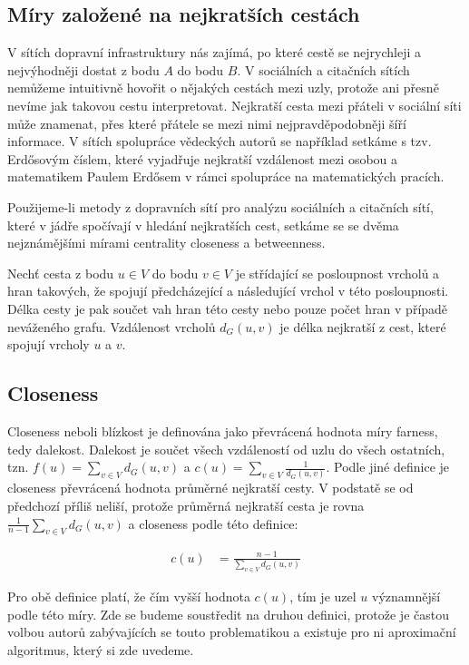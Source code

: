 \documentclass[12pt,titlepage]{report}
\begin{document}
\subsection{Míry založené na nejkratších cestách}
V sítích dopravní infrastruktury nás zajímá, po které cestě se nejrychleji a
nejvýhodněji dostat z bodu $A$ do bodu $B$. V sociálních a citačních sítích
nemůžeme intuitivně hovořit o nějakých cestách mezi uzly, protože ani přesně
nevíme jak takovou cestu interpretovat. Nejkratší cesta mezi přáteli v sociální
síti může znamenat, přes které přátele se mezi nimi nejpravděpodobněji šíří
informace. V sítích spolupráce vědeckých autorů se například setkáme s tzv.
Erdősovým číslem, které vyjadřuje nejkratší vzdálenost mezi osobou a
matematikem Paulem Erdősem v rámci spolupráce na matematických pracích.

Použijeme-li metody z dopravních sítí pro analýzu sociálních a citačních sítí,
které v jádře spočívají v hledání nejkratších cest, setkáme se se dvěma
nejznámějšími mírami centrality closeness a betweenness.

Nechť cesta z bodu $u \in V$ do bodu $v \in V$ je střídající se posloupnost
vrcholů a hran takových, že spojují předcházející a následující vrchol v této
posloupnosti. Délka cesty je pak součet vah hran této cesty nebo pouze počet
hran v případě neváženého grafu. Vzdálenost vrcholů $d_G(u, v)$ je délka
nejkratší z cest, které spojují vrcholy $u$ a $v$.

\subsection{Closeness}
Closeness neboli blízkost je definována jako převrácená hodnota míry farness,
tedy dalekost. Dalekost je součet všech vzdáleností od uzlu do všech ostatních,
tzn. $f(u) = \sum_{v \in V} d_G(u, v)$ a $c(u) = \sum_{v \in V} \frac{1}{d_G(u,
v)}$. Podle jiné definice je closeness převrácená hodnota průměrné nejkratší
cesty. V podstatě se od předchozí příliš neliší, protože průměrná nejkratší
cesta je rovna $\frac{1}{n
- 1} \sum_{v \in V} d_G(u, v)$ a closeness podle této definice:

\begin{align*}
c(u) &= \frac{n - 1}{\sum_{v \in V} d_G(u, v)}
\end{align*}

Pro obě definice platí, že čím vyšší hodnota $c(u)$, tím je uzel $u$
významnější podle této míry. Zde se budeme soustředit na druhou definici,
protože je častou volbou autorů zabývajících se touto problematikou a existuje
pro ni aproximační algoritmus, který si zde uvedeme.
\end{document}
